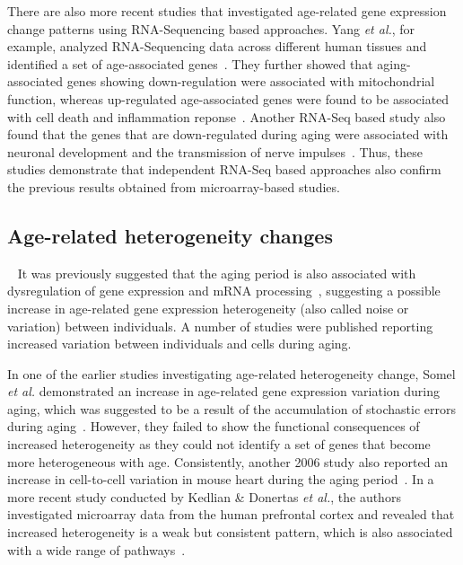 There are also more recent studies that investigated age-related gene expression change patterns using RNA-Sequencing based approaches.
Yang \textit{et al.}, for example, analyzed RNA-Sequencing data across different human tissues and identified a set of age-associated genes~\autocite{Yang2015}.
They further showed that aging-associated genes showing down-regulation were associated with mitochondrial function,
whereas up-regulated age-associated genes were found to be associated with cell death and inflammation reponse~\autocite{Yang2015}.
Another RNA-Seq based study also found that the genes that are down-regulated during aging were associated with
neuronal development and the transmission of nerve impulses~\autocite{Naumova2012}.
Thus, these studies demonstrate that independent RNA-Seq based approaches also confirm the previous results obtained from microarray-based studies.

\subsection{Age-related heterogeneity changes}~\label{intro:het.change}
It was previously suggested that the aging period is also associated with dysregulation of gene expression and mRNA processing~\autocite{Frenk2018},
suggesting a possible increase in age-related gene expression heterogeneity (also called noise or variation) between individuals.
A number of studies were published reporting increased variation between individuals and cells during aging.

In one of the earlier studies investigating age-related heterogeneity change, 
Somel \textit{et al.} demonstrated an increase in age-related gene expression variation during aging,
which was suggested to be a result of the accumulation of stochastic errors during aging~\autocite{Somel2006}.
However, they failed to show the functional consequences of increased heterogeneity 
as they could not identify a set of genes that become more heterogeneous with age.
Consistently, another 2006 study also reported an increase in cell-to-cell variation in mouse heart during the aging period~\autocite{Bahar2006}.
In a more recent study conducted by Kedlian \& Donertas \textit{et al.}, the authors investigated 
microarray data from the human prefrontal cortex and revealed that increased heterogeneity is a weak but consistent pattern,
which is also associated with a wide range of pathways~\autocite{Kedlian2019}.

